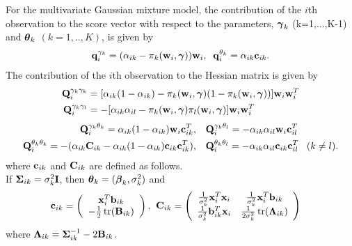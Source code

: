 \begin{theorem}
For the multivariate Gaussian mixture model, the contribution of the $i$th observation to the score vector with respect to the parameters, $\boldsymbol\gamma_{k}$ (k=1,...,K-1) and $\boldsymbol\theta_{k}$ $(k=1,..,K)$, is given by
\begin{align*}
\mathbf q_{i}^{\gamma_{k}}=(\alpha_{ik}-\pi_{k}(\mathbf w_{i},\boldsymbol\gamma))\mathbf w_{i},\;\; \mathbf q_{i}^{\theta_{k}}=\alpha_{ik}\mathbf c_{ik}.
\end{align*}
The contribution of the $i$th observation to the Hessian matrix is given by
\begin{align*}
\mathbf Q_{i}^{\gamma_{k}\gamma_{k}}&=[\alpha_{ik}(1-\alpha_{ik})-\pi_{k}(\mathbf w_{i},\boldsymbol\gamma)(1-\pi_{k}(\mathbf w_{i},\boldsymbol\gamma))]\mathbf w_{i}\mathbf w_{i}^{T}\\
\mathbf Q_{i}^{\gamma_{k}\gamma_{l}}&=-[\alpha_{ik}\alpha_{il}-\pi_{k}(\mathbf w_{i},\boldsymbol\gamma)\pi_{l}(\mathbf w_{i},\boldsymbol\gamma)]\mathbf w_{i}\mathbf w_{i}^{T}
\end{align*}
\begin{align*}
\mathbf Q_{i}^{\gamma_{k}\theta_{k}}=\alpha_{ik}(1-\alpha_{ik})\mathbf w_{i}\mathbf c_{ik}^{T},&\quad \mathbf Q_{i}^{\gamma_{k}\theta_{l}}=-\alpha_{ik}\alpha_{il}\mathbf w_{i}\mathbf c_{il}^{T}\\
\mathbf Q_{i}^{\theta_{k}\theta_{k}}=-(\alpha_{ik}\mathbf C_{ik}-\alpha_{ik}(1-\alpha_{ik})\mathbf c_{ik}\mathbf c_{ik}^{T}\mathbf ),&\quad \mathbf Q_{i}^{\theta_{k}\theta_{l}}=-\alpha_{ik}\alpha_{il}\mathbf c_{ik}\mathbf c_{il}^{T}\;\;\;(k\not=l).
\end{align*}
where $\mathbf c_{ik}$ and $\mathbf C_{ik}$ are defined as follows.\\

If $\boldsymbol\Sigma_{ik}=\sigma_{k}^{2}\mathbf I$, then $\boldsymbol\theta_{k}=(\boldsymbol\beta_{k},\sigma^{2}_{k})$ and
\begin{align*}
\mathbf c_{ik}=\left( \begin{array}{c}\mathbf x_{i}^{T}\mathbf b_{ik}\\ -\frac{1}{2} \operatorname{tr}(\mathbf B_{ik})\end{array}\right),&\;\;
\mathbf C_{ik}=\left(\begin{array}{cc} \frac{1}{\sigma^{2}_{k}}\mathbf x_{i}^{T}\mathbf x_{i}&\frac{1}{\sigma^{2}_{k}}\mathbf x_{i}^{T}\mathbf b_{ik}\\ \frac{1}{\sigma^{2}_{k}}\mathbf b^{T}_{ik}\mathbf x_{i}&\frac{1}{2\sigma^{2}_{k}}\operatorname{tr}(\boldsymbol \Lambda_{ik} )\end{array} \right)
\end{align*}
where $\boldsymbol \Lambda_{ik} = \boldsymbol\Sigma_{ik}^{-1}-2\mathbf B_{ik}$.\\


\end{theorem}
